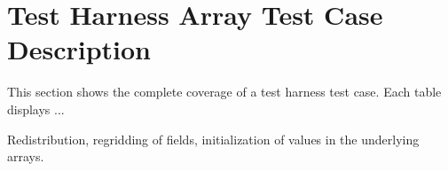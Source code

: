 \section{Test Harness Array Test Case Description}
This section shows the complete coverage of a test harness test case. Each table displays ...


Redistribution, regridding of fields, initialization of values in the underlying arrays.


